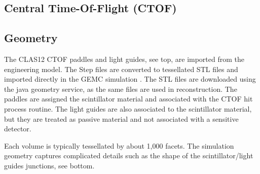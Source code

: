 \subsection{Central Time-Of-Flight (CTOF)}

\subsection{Geometry}

The CLAS12 CTOF paddles and light guides, see  top, are imported from the engineering model. The Step files are converted to tessellated STL files and imported
directly in the GEMC simulation \cite{gemcCad}. The STL files are downloaded using the java geometry service, as the same files are used in reconstruction.
The paddles are assigned the scintillator material and associated with the CTOF hit process routine.
The light guides are also associated to the scintillator material, but they are treated as passive material and not associated with a sensitive detector.

Each volume is typically tessellated by about 1,000 facets. The simulation geometry captures complicated details such as the shape of the scintillator/light guides
junctions, see  bottom.

